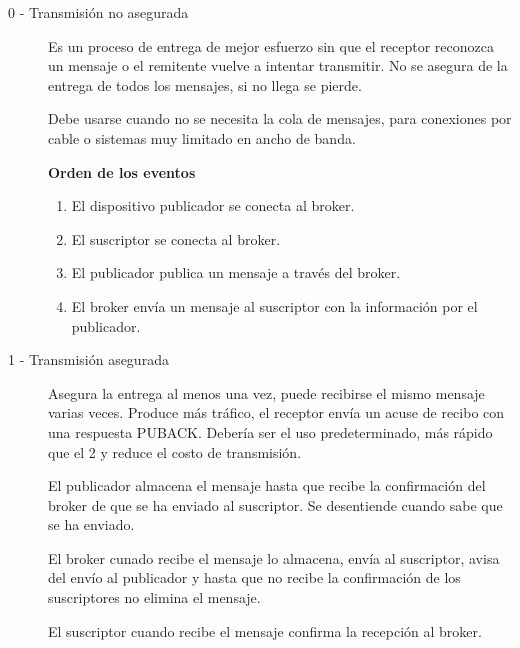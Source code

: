 \documentclass[12pt, twoside, openright]{report} %
\begin{document}
\begin{description}
	\item[0 - Transmisión no asegurada] Es un proceso de entrega de mejor esfuerzo sin que el receptor reconozca un mensaje o el remitente vuelve a intentar transmitir. No se asegura de la entrega de todos los mensajes, si no llega se pierde.

	      Debe usarse cuando no se necesita la cola de mensajes, para conexiones por cable o sistemas muy limitado en ancho de banda.

	      \textbf{Orden de los eventos}
	      \begin{enumerate}
		      \item El dispositivo publicador se conecta al broker.
		      \item El suscriptor se conecta al broker.
		      \item El publicador publica un mensaje a través del broker.
		      \item El broker envía un mensaje al suscriptor con la información por el publicador.
	      \end{enumerate}

	\item[1 - Transmisión asegurada] Asegura la entrega al menos una vez, puede recibirse el mismo mensaje varias veces. Produce más tráfico, el receptor envía un acuse de recibo con una respuesta PUBACK. Debería ser el uso predeterminado, más rápido que el 2 y reduce el costo de transmisión.

	      El publicador almacena el mensaje hasta que recibe la confirmación del broker de que se ha enviado al suscriptor. Se desentiende cuando sabe que se ha enviado.

	      El broker cunado recibe el mensaje lo almacena, envía al suscriptor, avisa del envío al publicador y hasta que no recibe la confirmación de los suscriptores no elimina el mensaje.

	      El suscriptor cuando recibe el mensaje confirma la recepción al broker.


\end{description}
\end{document}
